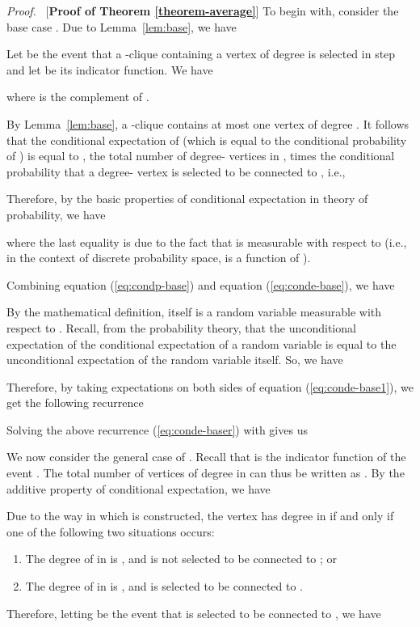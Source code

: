 \documentclass[11pt]{article}
\newenvironment{proof}[0]{\textit{Proof.} }{\hfill   }
\begin{document}
\begin{proof}\ [\textbf{Proof of Theorem \ref{theorem-average}}]
To begin with, consider the base case .
Due to Lemma~\ref{lem:base}, we have

Let  be the event that a -clique containing a vertex of degree  is selected
in step  and let  be its indicator function. We have

where  is the complement of .

By Lemma~\ref{lem:base}, a -clique contains at most 
one vertex of degree . It follows that the conditional expectation
of  (which is equal to the conditional probability of ) 
is equal to , the  total number of degree- vertices
in , times the conditional probability that a degree-
vertex is selected to be connected to , i.e.,    


Therefore, by the basic  properties of conditional expectation in theory of probability,
we have

where the last equality is due to the fact that  is measurable
with respect to  (i.e., in the context of discrete probability space, 
is a function of ).

Combining equation (\ref{eq:condp-base}) and equation (\ref{eq:conde-base}), we have

By the mathematical definition,  itself
is a random variable measurable with respect to . 
Recall, from the probability theory, that the unconditional
expectation of the conditional expectation of a random variable is equal to the 
unconditional expectation of the random variable itself. So, we have

Therefore, by taking expectations on both sides of equation
(\ref{eq:conde-base1}), we get the following recurrence 


Solving the above recurrence (\ref{eq:conde-baser}) with  gives us


We now consider the general case of . 
Recall that  is the indicator function of the event
.  The total number of 
vertices of degree  in  can thus be written as
. 
By the additive property of conditional expectation, we have

Due to the way in which  is constructed,  the vertex  has degree  in 
 if and only if one of the following two situations occurs:
\begin{enumerate}
\item The degree of  in  is , and   is not selected to be connected
to ; or
\item The degree of  in  is , and  is selected to be connected
to .   
\end{enumerate}
Therefore,  letting  be the event that  is selected to be connected to , we have


\end{proof}
\end{document}
